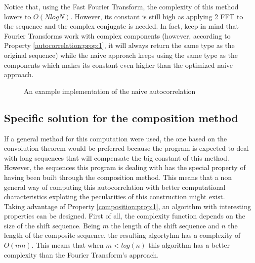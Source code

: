         Notice that, using the Fast Fourier
        Transform\cite{fast_fourier_transform}, the complexity of this
        method lowers to $O(N log N)$. However, its constant is
        still high as applying 2 FFT to the sequence and the
        complex conjugate is needed. In fact, keep in mind that Fourier
        Transforms work with complex components (however, according to
        Property \ref{autocorrelation:prop:1}, it will always return
        the same type as the original sequence) while the naive approach keeps
        using the same type as the components which makes its constant even higher
        than the optimized naive approach.

          \begin{figure}
            \caption{An example implementation of the naive autocorrelation}
            \label{naive_auto:fig:1}
          \end{figure}

      \subsection{Specific solution for the composition method}

      If a general method for this computation were used, the one based on the
      convolution theorem would be preferred because the program is
      expected to deal with long sequences that will compensate the big constant
      of this method.\\

      However, the sequences this program is dealing with has the special property
      of having been built through the composition method. This means that a non
      general way of computing this autocorrelation with better
      computational characteristics exploting the pecularities of this
      construction might exist.\\

      Taking advantage of Property \ref{composition:prop:1}, an algorithm with
      interesting properties can be designed. First of all, the complexity
      function depends on the size of the shift sequence. Being $m$ the
      length of the shift sequence and $n$ the length of the composite
      sequence, the resulting algortyhm has a complexity of $O(nm)$. This means
      that when $m < log(n)$ this algorithm has a better complexity than the
      Fourier Transform's approach.\\

